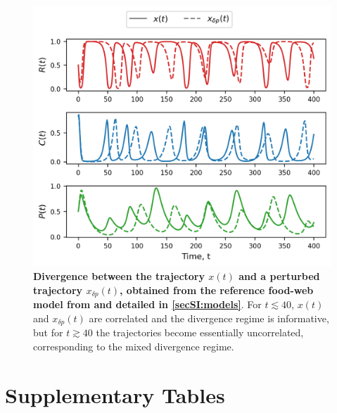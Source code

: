 \begin{figure}[ht]
    \centering
    \includegraphics[]{figures/SI/perturbed_p.png}
    \caption{\textbf{Divergence between the trajectory $x(t)$ and a perturbed trajectory $x_{\delta p}(t)$, obtained from the reference food-web model from \cite{Hastings1991} and detailed in \cref{secSI:models}}. For $t \lesssim 40$, $x(t)$ and $x_{\delta p}(t)$ are correlated and the divergence regime is informative, but for $t \gtrsim 40$ the trajectories become essentially uncorrelated, corresponding to the mixed divergence regime. }
    \label{figSI:perturbed_p}
\end{figure}

\FloatBarrier

\section{Supplementary Tables}

\begin{table}[ht]
  \centering
  \caption{\textbf{Simulation time for the complete and partial observation settings.}}
\label{tableSI:simul_time}
\end{table}

